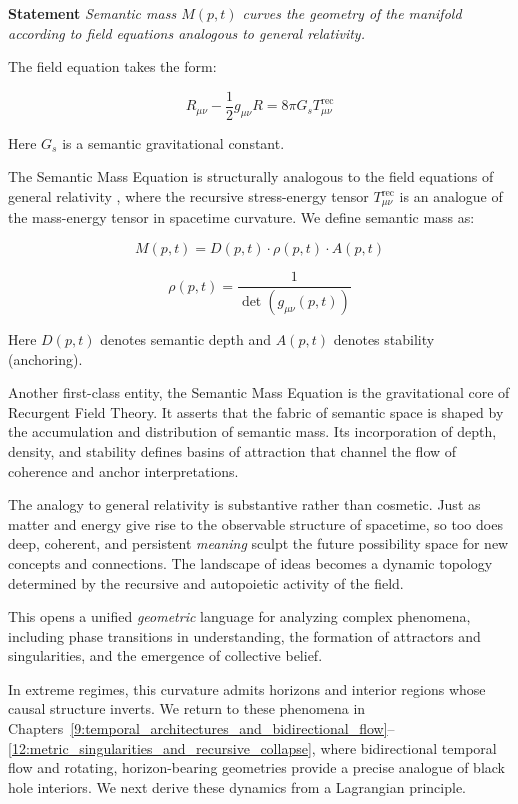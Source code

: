 \textbf{Statement} \textit{Semantic mass \(M(p,t)\) curves the geometry of the manifold according to field equations analogous to general relativity.}

The field equation takes the form:

\begin{equation}
R_{\mu\nu} - \frac{1}{2}g_{\mu\nu}R = 8\pi G_s T^{\text{rec}}_{\mu\nu}
\end{equation}

Here \(G_s\) is a semantic gravitational constant.

The Semantic Mass Equation is structurally analogous to the field equations of general relativity \autocite{Einstein1915, MisnerThorneWheeler1973, Wald1984}, where the recursive stress-energy tensor \(T^{\text{rec}}_{\mu\nu}\) is an analogue of the mass-energy tensor in spacetime curvature. We define semantic mass as:

\begin{equation}
M(p,t) = D(p,t) \cdot \rho(p,t) \cdot A(p,t)
\end{equation}

\begin{equation}
\rho(p,t) = \frac{1}{\det(g_{\mu\nu}(p,t))}
\end{equation}

Here \(D(p,t)\) denotes semantic depth and \(A(p,t)\) denotes stability (anchoring).

Another first-class entity, the Semantic Mass Equation is the gravitational core of Recurgent Field Theory. It asserts that the fabric of semantic space is shaped by the accumulation and distribution of semantic mass. Its incorporation of depth, density, and stability defines basins of attraction that channel the flow of coherence and anchor interpretations.

The analogy to general relativity is substantive rather than cosmetic. Just as matter and energy give rise to the observable structure of spacetime, so too does deep, coherent, and persistent \textit{meaning} sculpt the future possibility space for new concepts and connections. The landscape of ideas becomes a dynamic topology determined by the recursive and autopoietic activity of the field.

This opens a unified \textit{geometric} language for analyzing complex phenomena, including phase transitions in understanding, the formation of attractors and singularities, and the emergence of collective belief.

In extreme regimes, this curvature admits horizons and interior regions whose causal structure inverts. We return to these phenomena in Chapters~\ref{9:temporal_architectures_and_bidirectional_flow}--\ref{12:metric_singularities_and_recursive_collapse}, where bidirectional temporal flow and rotating, horizon-bearing geometries provide a precise analogue of black hole interiors. We next derive these dynamics from a Lagrangian principle.

